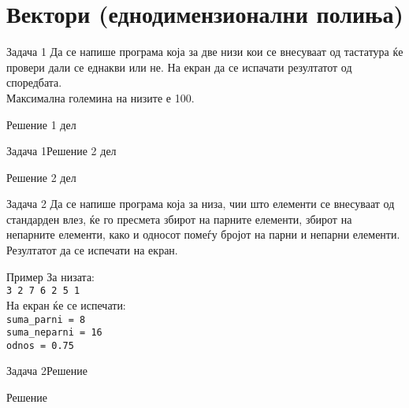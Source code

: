 
\section{Вектори (еднодимензионални полиња)}

\begin{frame}[fragile]{Задача 1}
Да се напише програма која за две низи кои се внесуваат од тастатура ќе провери
дали се еднакви или не. На екран да се испачати резултатот од споредбата.\\
Максимална големина на низите е 100.
\pause
\begin{exampleblock}{Решение 1 дел}

\end{exampleblock}
\end{frame}

\begin{frame}[fragile]{Задача 1}{Решение 2 дел}
\begin{exampleblock}{Решение 2 дел}

\end{exampleblock}
\end{frame}


\begin{frame}{Задача 2}
Да се напише програма која за низа, чии што елементи се внесуваат од стандарден влез, ќе го пресмета збирот на парните елементи, 
збирот на непарните елементи, како и односот помеѓу бројот на парни и непарни елементи. Резултатот да се испечати на екран.
\begin{exampleblock}{Пример}
За низата:\\
\texttt{3 {\color{red}2} 7 {\color{red}6} {\color{red}2} 5 1}\\
На екран ќе се испечати: \\
\texttt{suma\_parni = 8}\\
\texttt{suma\_neparni = 16}\\
\texttt{odnos = 0.75}
\end{exampleblock}
\end{frame}

\begin{frame}[fragile]{Задача 2}{Решение} 
\begin{exampleblock}{Решение}

\end{exampleblock}
\end{frame}

